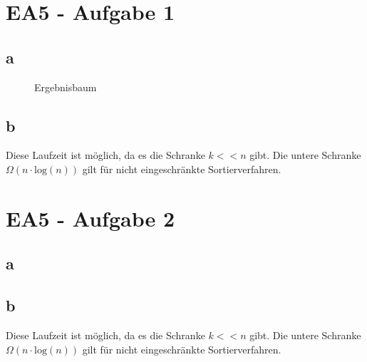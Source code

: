 \documentclass[12pt]{article}
\begin{document}
\section*{EA5 - Aufgabe 1}

\subsection*{a}
\begin{figure}[h]
	\centering
	\scalebox{.5}{}
	\caption{Ergebnisbaum}
	\label{img:abb2}
\end{figure}

\subsection*{b}
Diese Laufzeit ist möglich, da es die Schranke $k << n$ gibt. Die untere Schranke $\Omega (n  \cdot \text{log}(n))$ gilt für nicht eingeschränkte Sortierverfahren.

\section*{EA5 - Aufgabe 2}

\subsection*{a}

\subsection*{b}
Diese Laufzeit ist möglich, da es die Schranke $k << n$ gibt. Die untere Schranke $\Omega (n  \cdot \text{log}(n))$ gilt für nicht eingeschränkte Sortierverfahren.
\end{document}
